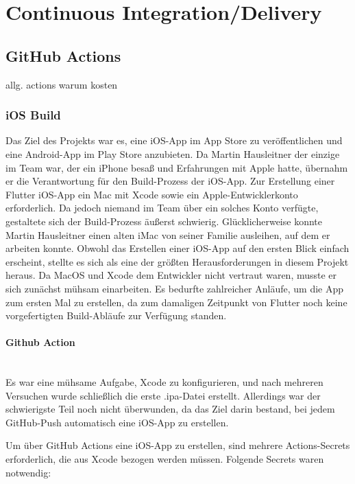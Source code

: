 \section{Continuous Integration/Delivery}
\subsection{GitHub Actions}

allg. actions warum kosten
\subsubsection{iOS Build}  Das
Ziel des Projekts war es, eine \cite{ios_app_store} iOS-App
im App Store zu veröffentlichen und eine Android-App im Play Store anzubieten. Da Martin Hausleitner der einzige im Team war, der ein iPhone besaß und Erfahrungen mit Apple hatte, übernahm er die Verantwortung für den Build-Prozess der iOS-App.
Zur Erstellung einer \cite{flutter} Flutter iOS-App ein Mac mit \cite{xcode} Xcode sowie ein \cite{apple_developer_program} Apple-Entwicklerkonto erforderlich. Da jedoch niemand im Team über ein solches Konto verfügte, gestaltete sich der Build-Prozess äußerst schwierig. Glücklicherweise konnte Martin Hausleitner einen alten iMac von seiner Familie ausleihen, auf dem er arbeiten konnte. Obwohl das Erstellen einer iOS-App auf den ersten Blick einfach erscheint, stellte es sich als eine der größten Herausforderungen in diesem Projekt heraus.
Da MacOS und Xcode dem Entwickler nicht vertraut waren, musste er sich zunächst mühsam einarbeiten. Es bedurfte zahlreicher Anläufe, um die App zum ersten Mal zu erstellen, da zum damaligen Zeitpunkt von Flutter noch keine vorgefertigten Build-Abläufe zur Verfügung standen.


\paragraph{Github Action}\mbox{} \\
Es war eine mühsame Aufgabe, Xcode zu konfigurieren, und
nach mehreren Versuchen wurde schließlich die erste
.ipa-Datei erstellt. Allerdings war der schwierigste Teil
noch nicht überwunden, da das Ziel darin bestand, bei jedem
GitHub-Push automatisch eine iOS-App zu erstellen.

Um über GitHub Actions eine iOS-App zu erstellen, sind
mehrere Actions-Secrets erforderlich, die aus Xcode bezogen
werden müssen. Folgende Secrets waren notwendig:

